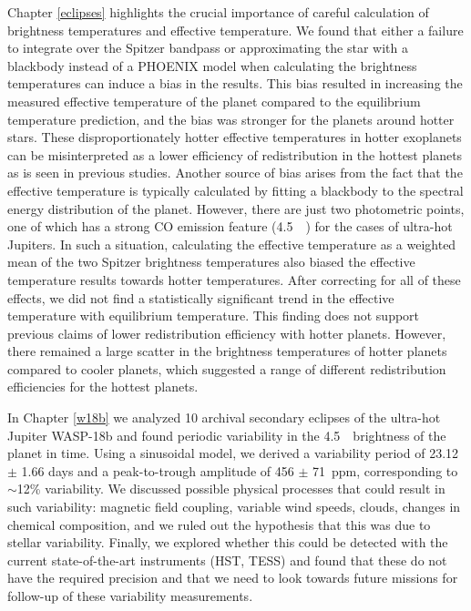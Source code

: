 Chapter \ref{eclipses} highlights the crucial importance of careful calculation of brightness temperatures and effective temperature. We found that either a failure to integrate over the Spitzer bandpass or approximating the star with a blackbody instead of a PHOENIX model when calculating the brightness temperatures can induce a bias in the results. This bias resulted in increasing the measured effective temperature of the planet compared to the equilibrium temperature prediction, and the bias was stronger for the planets around hotter stars. These disproportionately hotter effective temperatures in hotter exoplanets can be misinterpreted as a lower efficiency of redistribution in the hottest planets as is seen in previous studies. Another source of bias arises from the fact that the effective temperature is typically calculated by fitting a blackbody to the spectral energy distribution of the planet. However, there are just two photometric points, one of which has a strong CO emission feature (4.5~\um~) for the cases of ultra-hot Jupiters. In such a situation, calculating the effective temperature as a weighted mean of the two Spitzer brightness temperatures also biased the effective temperature results towards hotter temperatures. After correcting for all of these effects, we did not find a statistically significant trend in the effective temperature with equilibrium temperature. This finding does not support previous claims of lower redistribution efficiency with hotter planets. However, there remained a large scatter in the brightness temperatures of hotter planets compared to cooler planets, which suggested a range of different redistribution efficiencies for the hottest planets.

In Chapter \ref{w18b} we analyzed 10 archival secondary eclipses of the ultra-hot Jupiter WASP-18b and found periodic variability in the 4.5~\um~brightness of the planet in time. Using a sinusoidal model, we derived a variability period of 23.12 $\pm$ 1.66 days and a peak-to-trough amplitude of 456 $\pm$ 71~ppm, corresponding to $\sim$12\% variability. We discussed possible physical processes that could result in such variability: magnetic field coupling, variable wind speeds, clouds, changes in chemical composition, and we ruled out the hypothesis that this was due to stellar variability. Finally, we explored whether this could be detected with the current state-of-the-art instruments (HST, TESS) and found that these do not have the required precision and that we need to look towards future missions for follow-up of these variability measurements.

